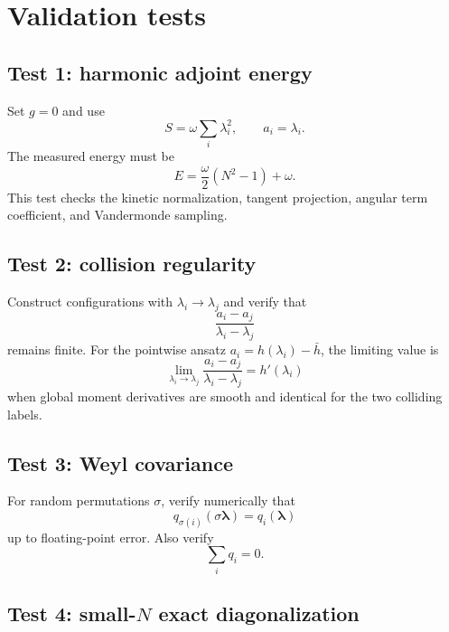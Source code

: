 \documentclass[11pt]{article}
\begin{document}
\section{Validation tests}

\subsection{Test 1: harmonic adjoint energy}

Set $g=0$ and use
\begin{equation}
S=\omega\sum_i\lambda_i^2,
\qquad
 a_i=\lambda_i.
\end{equation}
The measured energy must be
\begin{equation}
E=\frac\omega2(N^2-1)+\omega.
\end{equation}
This test checks the kinetic normalization, tangent projection, angular term coefficient, and Vandermonde sampling.

\subsection{Test 2: collision regularity}

Construct configurations with $\lambda_i\to\lambda_j$ and verify that
\begin{equation}
\frac{a_i-a_j}{\lambda_i-\lambda_j}
\end{equation}
remains finite.  For the pointwise ansatz $a_i=h(\lambda_i)-\bar h$, the limiting value is
\begin{equation}
\lim_{\lambda_i\to\lambda_j}\frac{a_i-a_j}{\lambda_i-\lambda_j}=h'(\lambda_i)
\end{equation}
when global moment derivatives are smooth and identical for the two colliding labels.

\subsection{Test 3: Weyl covariance}

For random permutations $\sigma$, verify numerically that
\begin{equation}
q_{\sigma(i)}(\sigma\bm\lambda)=q_i(\bm\lambda)
\end{equation}
up to floating-point error.  Also verify
\begin{equation}
\sum_iq_i=0.
\end{equation}

\subsection{Test 4: small-$N$ exact diagonalization}
\end{document}
